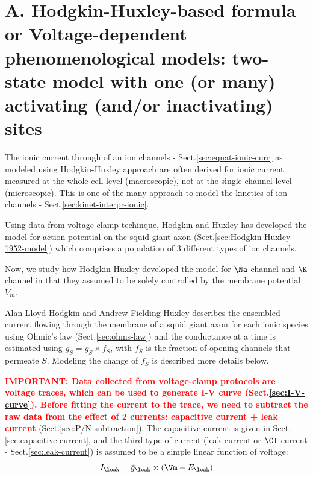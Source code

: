 \section{A. Hodgkin-Huxley-based formula or Voltage-dependent phenomenological
models: two-state model with one (or many) activating (and/or inactivating)
sites}
\label{sec:model_HH-based}

The ionic current through of an ion channels - Sect.\ref{sec:equat-ionic-curr}
as modeled using Hodgkin-Huxley approach are often derived for ionic current
measured at the whole-cell level (macroscopic), not at the single channel level
(microscopic). This is one of the many approach to model the kinetics of ion
channels - Sect.\ref{sec:kinet-interpr-ionic}.

Using data from voltage-clamp techinque, Hodgkin and Huxley has developed the
model for action potential on the squid giant axon
(Sect.\ref{sec:Hodgkin-Huxley-1952-model}) which comprises a population of 3
different types of ion channels.

Now, we study how Hodgkin-Huxley developed the model for $\Na$ channel and $\K$
channel in that they assumed to be solely controlled by the membrane potential
$V_m$.

Alan Lloyd Hodgkin and Andrew Fielding Huxley describes the ensembled current
flowing through the membrane of a squid giant axon for each ionic species using
Ohmic's law (Sect.\ref{sec:ohms-law}) and the conductance at a time is estimated
using $g_S = \bar{g}_S \times f_S$, with $f_S$ is the fraction of opening
channels that permeate $S$. Modeling the change of $f_S$ is described more
details below.


\textcolor{red}{\bf IMPORTANT: Data collected from voltage-clamp protocols are
voltage traces, which can be used to generate I-V curve
(Sect.\ref{sec:I-V-curve}). Before fitting the current to the trace, we need to
subtract the raw data from the effect of 2 currents: capacitive current + leak
current} (Sect.\ref{sec:P/N-subtraction}). The capacitive current is given in
Sect.\ref{sec:capacitive-current}, and the third type of current (leak current
or $\Cl$ current - Sect.\ref{sec:leak-current}) is assumed to be a simple
linear function of voltage:
\begin{equation}
I_\leak = \bar{g}_\leak \times (\Vm - E_\leak)
\end{equation}

